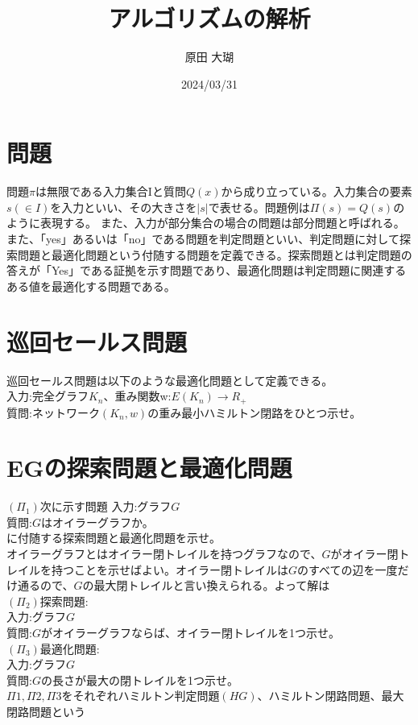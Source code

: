 \documentclass[twocolumn]{jarticle}
\title{アルゴリズムの解析}
\author{原田 大瑚}
\date{2024/03/31}
\begin{document}
\maketitle

\section{問題}
問題$\pi$は無限である入力集合Iと質問$Q(x)$から成り立っている。入力集合の要素$s(\in I)$を入力といい、その大きさを$|s|$で表せる。問題例は$\Pi(s)=Q(s)$のように表現する。
また、入力が部分集合の場合の問題は部分問題と呼ばれる。また、「yes」あるいは「no」である問題を判定問題といい、判定問題に対して探索問題と最適化問題という付随する問題を定義できる。探索問題とは判定問題の答えが「Yes」である証拠を示す問題であり、最適化問題は判定問題に関連するある値を最適化する問題である。

\section{巡回セールス問題}
巡回セールス問題は以下のような最適化問題として定義できる。\\
入力:完全グラフ$K_n$、重み関数w:$E(K_n) \rightarrow R_+$\\
質問:ネットワーク$(K_n,w)$の重み最小ハミルトン閉路をひとつ示せ。\\

\section{EGの探索問題と最適化問題}
\noindent$(\Pi_1)$次に示す問題
入力:グラフ$G$\\
質問:$G$はオイラーグラフか。\\
に付随する探索問題と最適化問題を示せ。\\

オイラーグラフとはオイラー閉トレイルを持つグラフなので、$G$がオイラー閉トレイルを持つことを示せばよい。オイラー閉トレイルは$G$のすべての辺を一度だけ通るので、$G$の最大閉トレイルと言い換えられる。よって解は\\
$(\Pi_2)$探索問題:\\
入力:グラフ$G$\\
質問:$G$がオイラーグラフならば、オイラー閉トレイルを1つ示せ。\\
$(\Pi_3)$最適化問題:\\
入力:グラフ$G$\\
質問:$G$の長さが最大の閉トレイルを1つ示せ。\\
$\Pi 1,\Pi 2,\Pi 3$をそれぞれハミルトン判定問題$(HG)$、ハミルトン閉路問題、最大閉路問題という
\end{document}
